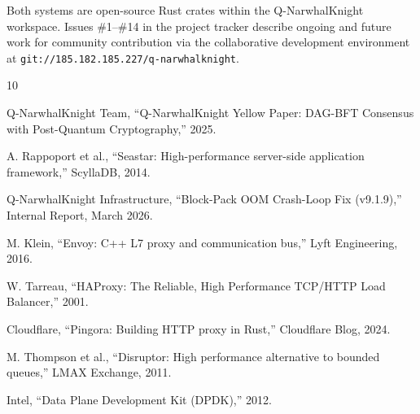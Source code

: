 \documentclass[11pt,a4paper,twocolumn]{article}
\begin{document}
Both systems are open-source Rust crates within the Q-NarwhalKnight workspace. Issues \#1--\#14 in the project tracker describe ongoing and future work for community contribution via the collaborative development environment at \texttt{git://185.182.185.227/q-narwhalknight}.

\begin{thebibliography}{10}

Q-NarwhalKnight Team, ``Q-NarwhalKnight Yellow Paper: DAG-BFT Consensus with Post-Quantum Cryptography,'' 2025.

A. Rappoport et al., ``Seastar: High-performance server-side application framework,'' ScyllaDB, 2014.

Q-NarwhalKnight Infrastructure, ``Block-Pack OOM Crash-Loop Fix (v9.1.9),'' Internal Report, March 2026.

M. Klein, ``Envoy: C++ L7 proxy and communication bus,'' Lyft Engineering, 2016.

W. Tarreau, ``HAProxy: The Reliable, High Performance TCP/HTTP Load Balancer,'' 2001.

Cloudflare, ``Pingora: Building HTTP proxy in Rust,'' Cloudflare Blog, 2024.

M. Thompson et al., ``Disruptor: High performance alternative to bounded queues,'' LMAX Exchange, 2011.

Intel, ``Data Plane Development Kit (DPDK),'' 2012.

\end{thebibliography}
\end{document}

